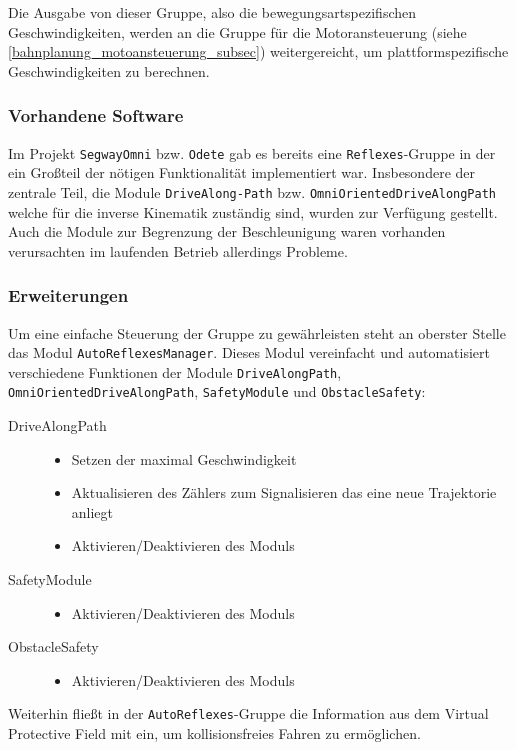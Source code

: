 Die Ausgabe von dieser Gruppe, also die bewegungsartspezifischen Geschwindigkeiten, werden an die Gruppe für die Motoransteuerung (siehe \ref{bahnplanung_motoansteuerung_subsec}) weitergereicht, um plattformspezifische Geschwindigkeiten zu berechnen.

\subsubsection{Vorhandene Software}
\label{bahnplanung_inv_kinem_vorhandene_software_sec}

Im Projekt \lstinline{SegwayOmni} bzw. \lstinline{Odete} gab es bereits eine \lstinline{Reflexes}-Gruppe in der ein Großteil der nötigen Funktionalität implementiert war.
 Insbesondere der zentrale Teil, die Module
 \lstinline{DriveAlong-}\lstinline{Path} bzw.
 \lstinline{OmniOrientedDriveAlongPath} welche für die inverse Kinematik zuständig sind, wurden zur Verfügung gestellt. Auch die Module zur Begrenzung der Beschleunigung waren vorhanden verursachten im laufenden Betrieb allerdings Probleme.

\subsubsection{Erweiterungen}
\label{bahnplanung_inv_kinem_erweiterung_sec}

Um eine einfache Steuerung der Gruppe zu gewährleisten steht an oberster Stelle das Modul \lstinline{AutoReflexesManager}. Dieses Modul vereinfacht und automatisiert verschiedene Funktionen der Module \lstinline{DriveAlongPath}, \lstinline{OmniOrientedDriveAlongPath}, \lstinline{SafetyModule} und \lstinline{ObstacleSafety}:
\begin{description}
	\item[DriveAlongPath]
	\begin{itemize}
		\item Setzen der maximal Geschwindigkeit
		\item Aktualisieren des Zählers zum Signalisieren das eine neue Trajektorie anliegt
		\item Aktivieren/Deaktivieren des Moduls
	\end{itemize}
	\item[SafetyModule] 
	\begin{itemize}
		\item Aktivieren/Deaktivieren des Moduls
	\end{itemize}
	\item[ObstacleSafety] 
	\begin{itemize}
	\item Aktivieren/Deaktivieren des Moduls	
	\end{itemize}
\end{description}
Weiterhin fließt in der \lstinline{AutoReflexes}-Gruppe die Information aus dem Virtual Protective Field mit ein, um kollisionsfreies Fahren zu ermöglichen.

